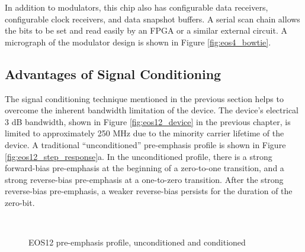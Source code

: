 


In addition to modulators, this chip also has configurable data receivers, configurable clock receivers, and data snapshot buffers.  A serial scan chain allows the bits to be set and read easily by an FPGA or a similar external circuit.  A micrograph of the modulator design is shown in Figure \ref{fig:eos4_bowtie}.


\subsection{Advantages of Signal Conditioning}

The signal conditioning technique mentioned in the previous section helps to overcome the inherent bandwidth limitation of the device.  The device's electrical 3 dB bandwidth, shown in Figure \ref{fig:eos12_device} in the previous chapter, is limited to approximately 250 MHz due to the minority carrier lifetime of the device.  A traditional ``unconditioned'' pre-emphasis profile is shown in Figure \ref{fig:eos12_step_response}a.  In the unconditioned profile, there is a strong forward-bias pre-emphasis at the beginning of a zero-to-one transition, and a strong reverse-bias pre-emphasis at a one-to-zero transition.  After the strong reverse-bias pre-emphasis, a weaker reverse-bias persists for the duration of the zero-bit.


	\begin{figure}[H]
		\begin{center}
			\\
		\end{center}
		\caption{\label{fig:eos12_profile}EOS12 pre-emphasis profile, unconditioned and conditioned }
	\end{figure}

